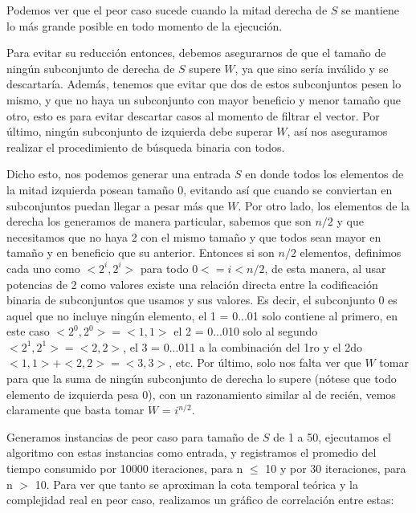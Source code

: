 \documentclass[a4paper]{article}
\begin{document}
Podemos ver que el peor caso sucede cuando la mitad derecha de $S$ se mantiene lo más grande posible en todo momento de la ejecución.

Para evitar su reducción entonces, debemos asegurarnos de que el tamaño de ningún subconjunto de derecha de $S$ supere $W$, ya que sino sería inválido y se descartaría. Además, tenemos que evitar que dos de estos subconjuntos pesen lo mismo, y que no haya un subconjunto con mayor beneficio y menor tamaño que otro, esto es para evitar descartar casos al momento de filtrar el vector. Por último, ningún subconjunto de izquierda debe superar $W$, así nos aseguramos realizar el procedimiento de búsqueda binaria con todos.

Dicho esto, nos podemos generar una entrada $S$ en donde todos los elementos de la mitad izquierda posean tamaño 0, evitando así que cuando se conviertan en subconjuntos puedan llegar a pesar más que $W$. Por otro lado, los elementos de la derecha los generamos de manera particular, sabemos que son $n/2$ y que necesitamos que no haya 2 con el mismo tamaño y que todos sean mayor en tamaño y en beneficio que su anterior. Entonces si son $n/2$ elementos, definimos cada uno como $<2^i,2^i>$ para todo $0 <= i < n/2$, de esta manera, al usar potencias de 2 como valores existe una relación directa entre la codificación binaria de subconjuntos que usamos y sus valores. Es decir, el subconjunto 0 es aquel que no incluye ningún elemento, el 1 = 0...01 solo contiene al primero, en este caso $<2^0,2^0> = <1,1>$ el 2 = 0...010 solo al segundo $<2^1,2^1> = <2,2>$, el 3 = 0...011 a la combinación del 1ro y el 2do $<1,1> + <2,2> = <3,3>$, etc. Por último, solo nos falta ver que $W$ tomar para que la suma de ningún subconjunto de derecha lo supere (nótese que todo elemento de izquierda pesa 0), con un razonamiento similar al de recién, vemos claramente que basta tomar $W$ = $i^{n/2}$.

Generamos instancias de peor caso para tamaño de $S$ de 1 a 50, ejecutamos el algoritmo con estas instancias como entrada, y registramos el promedio del tiempo consumido por 10000 iteraciones, para n $\leq$ 10  y por 30 iteraciones, para n $>$ 10. Para ver que tanto se aproximan la cota temporal teórica y la complejidad real en peor caso, realizamos un gráfico de correlación entre estas:
\end{document}
